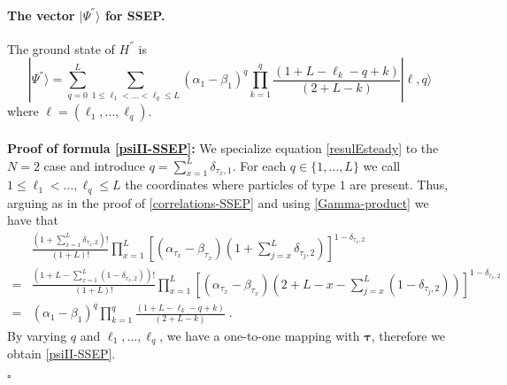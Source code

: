 \documentclass[10pt]{article}
\numberwithin{equation}{section}
\numberwithin{equation}{subsection}
\newcommand{\dt}{\;.}
\begin{document}
\paragraph{The vector $|\Psi^{''}\rangle$ for SSEP.} The ground state of $H^{''}$ is 
\begin{equation}\label{psiII-SSEP}
	|\Psi^{''}\rangle=\sum_{q=0}^{L}\sum_{1\leq \ell_{1}<\ldots<\ell_{q}\leq L}(\alpha_{1}-\beta_{1})^{q}\prod_{k=1}^{q}\frac{\left(1+L-\ell_{k}-q+k\right)}{(2+L-k)}|\bm{\ell},q\rangle
\end{equation}
where $\bm{\ell}=(\ell_{1},\ldots,\ell_{q})$. \\ \\
\textbf{Proof of formula \eqref{psiII-SSEP}:} We specialize equation \eqref{resulEsteady} to the {$N=2$ case} and introduce $q=\sum_{x=1}^{L}\delta_{\tau_{x},1}$. For each $q\in \{1,\ldots,L\}$ we call $1\leq\ell_{1}<\ldots,\ell_{q}\leq L$ the coordinates where particles of type $1$ are present. Thus, arguing as in the proof of \eqref{correlations-SSEP} and using \eqref{Gamma-product} we have that 
\begin{align}
	&\frac{\left(1+\sum_{x=1}^{L}\delta_{\tau_{x},2}\right)!}{\left(1+L\right)!}\prod_{x=1}^{L}\left[(\alpha_{\tau_{x}}-\beta_{\tau_{x}})\left(1+\sum_{j=x}^{L}\delta_{\tau_{j},2}\right)\right]^{1-\delta_{\tau_{x},2}}\nonumber\\%
	=&\frac{\left(1+L-\sum_{x=1}^{L}(1-\delta_{\tau_{x},2})\right)!}{\left(1+L\right)!}\prod_{x=1}^{L}\left[(\alpha_{\tau_{x}}-\beta_{\tau_{x}})\left(2+L-x-\sum_{j=x}^{L}(1-\delta_{\tau_{j},2})\right)\right]^{1-\delta_{\tau_{x},2}}\nonumber\\
	=&(\alpha_{1}-\beta_{1})^{q}\prod_{k=1}^{q}\frac{\left(1+L-\ell_{k}-q+k\right)}{(2+L-k)}\dt
\end{align}
By varying $q$ and $\ell_{1},\ldots,\ell_{q}$, we have a one-to-one mapping with $\bm{\tau}$, therefore we obtain \eqref{psiII-SSEP}.
\begin{flushright}
	$\square$
\end{flushright}
\end{document}
